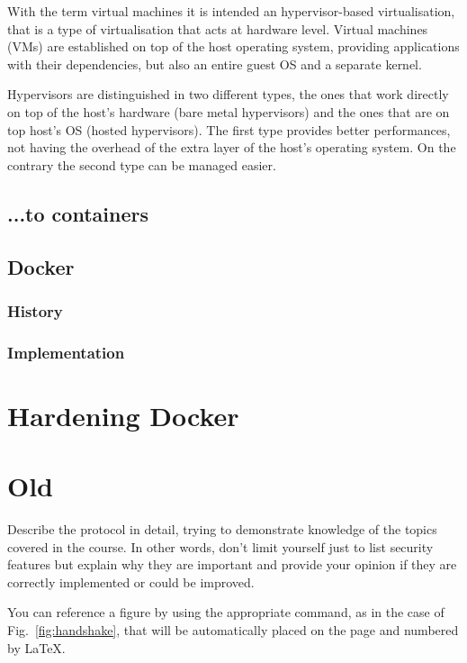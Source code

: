 \documentclass[a4paper,12pt]{article}
\def\myfig#1{Fig.~#1\xspace}
\begin{document}
With the term virtual machines it is intended an hypervisor-based virtualisation,
that is a type of virtualisation that acts at hardware level. Virtual machines 
(VMs) are established on top of the host operating system, providing applications
with their dependencies, but also an entire guest OS and a separate kernel. 
\par
Hypervisors are distinguished in two different types, the ones that work 
directly on top of the host's hardware (bare metal hypervisors) and the ones 
that are on top host's OS (hosted hypervisors). The first type provides better 
performances, not having the overhead of the extra layer of the host's operating 
system. On the contrary the second type can be managed easier.


\subsection{...to containers}

\subsection{Docker}

\subsubsection{History}

\subsubsection{Implementation}

\newpage

\section{Hardening Docker}

\section{Old}

Describe the protocol in detail, trying to demonstrate knowledge
of the topics covered in the course. In other words, don't limit
yourself just to list security features but explain why they are
important and provide your opinion if they are correctly implemented
or could be improved.

You can reference a figure by using the appropriate command,
as in the case of \myfig{\ref{fig:handshake}},
that will be automatically placed on the page and numbered by LaTeX.
\end{document}
